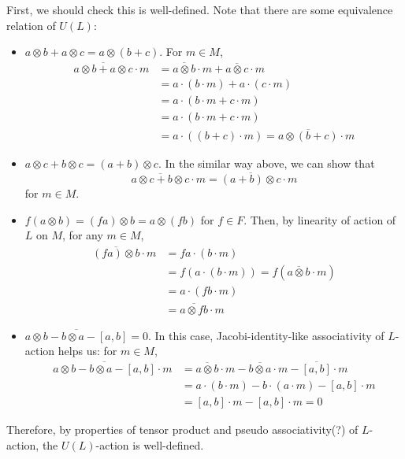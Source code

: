 First, we should check this is well-defined.
Note that there are some equivalence relation of \(U(L)\):
\begin{itemize}
\item
  \(a \otimes b + a \otimes c = a \otimes (b + c)\).
  For \(m \in M\),
  \begin{align*}
    \overline{a \otimes b + a \otimes c} \cdot m
    &= \overline{a \otimes b} \cdot m + \overline{a \otimes c} \cdot m
    \\&= a \cdot (b \cdot m) + a \cdot (c \cdot m)
    \\&= a \cdot (b \cdot m + c \cdot m)
    \\&= a \cdot (b \cdot m + c \cdot m)
    \\&= a \cdot ((b + c) \cdot m)
    = \overline{a \otimes (b + c)} \cdot m
  \end{align*}
\item
  \(a \otimes c + b \otimes c = (a + b) \otimes c\).
  In the similar way above, we can show that
  \[\overline{a \otimes c + b \otimes c} \cdot m
  = \overline{(a + b) \otimes c} \cdot m\]
  for \(m \in M\).
\item
  \(f (a \otimes b) = (fa) \otimes b = a \otimes (fb)\) for \(f \in F\).
  Then, by linearity of action of \(L\) on \(M\), for any \(m \in M\),
  \begin{align*}
    \overline{(fa) \otimes b} \cdot m
    &= fa \cdot (b \cdot m)
    \\&= f (a \cdot (b \cdot m))
    = f (\overline{a \otimes b} \cdot m)
    \\&= a \cdot (fb \cdot m)
    \\&= \overline{a \otimes fb} \cdot m
  \end{align*}
\item
  \(\overline{a \otimes b - b \otimes a - [a, b]} = 0\).
  In this case, Jacobi-identity-like associativity of \(L\)-action helps us:
  for \(m \in M\),
  \begin{align*}
    \overline{a \otimes b - b \otimes a - [a, b]} \cdot m
    &= \overline{a \otimes b} \cdot m - \overline{b \otimes a} \cdot m - \overline{[a, b]} \cdot m
    \\&= a \cdot (b \cdot m) - b \cdot (a \cdot m) - [a, b] \cdot m
    \\&= [a, b] \cdot m - [a, b] \cdot m
    = 0
  \end{align*}
\end{itemize}
Therefore, by properties of tensor product and pseudo associativity(?)
of \(L\)-action, the \(U(L)\)-action is well-defined.

